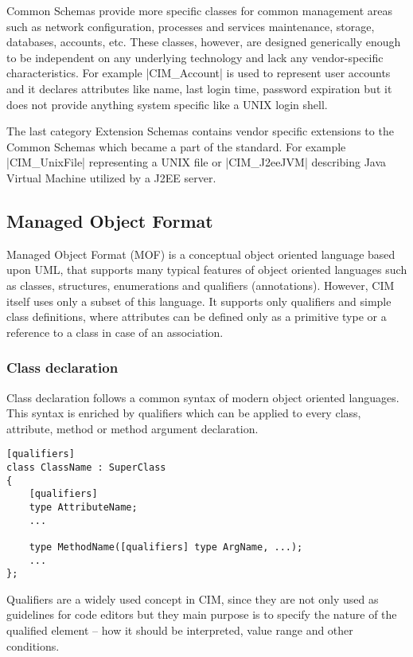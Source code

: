 Common Schemas provide more specific classes for common management areas such
as network configuration, processes and services maintenance, storage,
databases, accounts, etc. These classes, however, are designed generically
enough to be independent on any underlying technology and lack any
vendor-specific characteristics. For example |CIM_Account| is used to represent
user accounts and it declares attributes like name, last login time, password
expiration but it does not provide anything system specific like a UNIX login
shell.

The last category Extension Schemas contains vendor specific extensions to the
Common Schemas which became a part of the standard. For example |CIM_UnixFile|
representing a UNIX file or |CIM_J2eeJVM| describing Java Virtual Machine
utilized by a J2EE server.

\subsection{Managed Object Format}
\label{wbem:cim:mof}

Managed Object Format (MOF) is a conceptual object oriented language based upon
UML, that supports many typical features of object oriented languages such as
classes, structures, enumerations and qualifiers (annotations). However, CIM
itself uses only a subset of this language. It supports only qualifiers and
simple class definitions, where attributes can be defined only as a primitive
type or a reference to a class in case of an association.

\subsubsection{Class declaration}
\label{wbem:cim:mof:class}

Class declaration follows a common syntax of modern object oriented languages.
This syntax is enriched by qualifiers which can be applied to every class,
attribute, method or method argument declaration.

\begin{lstlisting}[caption={MOF class declaration},
label=lst:wbem:mof:class]
[qualifiers]
class ClassName : SuperClass
{
    [qualifiers]
    type AttributeName;
    ...
    
    type MethodName([qualifiers] type ArgName, ...);
    ...
};
\end{lstlisting}

Qualifiers are a widely used concept in CIM, since they are not only used as
guidelines for code editors but they main purpose is to specify the nature of
the qualified element -- how it should be interpreted, value range and other
conditions.

